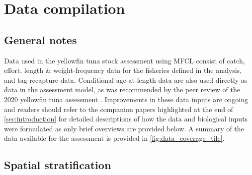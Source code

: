 
\section{Data compilation}
\label{sec:data_compilation}

\subsection{General notes}
\label{sec:general_notes}

Data used in the yellowfin tuna stock assessment using MFCL consist of catch, effort, length \& weight-frequency data for the fisheries defined in the analysis, and tag-recapture data. Conditional age-at-length data are also used directly as data in the assessment model, as was recommended by the peer review of the 2020 yellowfin tuna assessment \citep{punt_independent_2023}. Improvements in these data inputs are ongoing and readers should refer to the companion papers highlighted at the end of \autoref{sec:introduction} for detailed descriptions of how the data and biological inputs were formulated as only brief overviews are provided below. A summary of the data available for the assessment is provided in \autoref{fig:data_coverage_tile}.

\subsection{Spatial stratification}
\label{sec:spatial_stratification}


